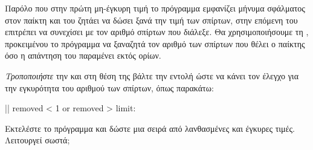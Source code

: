 \documentclass[a4paper,11pt,oneside]{book}
\begin{document}
\begin{step}
\label{step:check-matches-loop}
Παρόλο που στην πρώτη μη-έγκυρη τιμή το πρόγραμμα εμφανίζει μήνυμα σφάλματος στον παίκτη και του ζητάει να δώσει ξανά την τιμή των σπίρτων, στην επόμενη του επιτρέπει να συνεχίσει με τον αριθμό σπίρτων που διάλεξε. Θα χρησιμοποιήσουμε τη , προκειμένου το πρόγραμμα να ξαναζητά τον αριθμό των σπίρτων που θέλει ο παίκτης όσο η απάντηση του παραμένει εκτός ορίων.

\emph{Τροποποιήστε} την  και στη θέση της βάλτε την εντολή  ώστε να κάνει τον έλεγχο για την εγκυρότητα του αριθμού των σπίρτων, όπως παρακάτω:

\begin{pyplain}
|| removed < 1 or removed > limit:
\end{pyplain}

Εκτελέστε το πρόγραμμα και δώστε μια σειρά από λανθασμένες και έγκυρες τιμές. Λειτουργεί σωστά;

\marginnote[14pt]{\icondiscuss}
\dottedline
\end{step}
\end{document}
